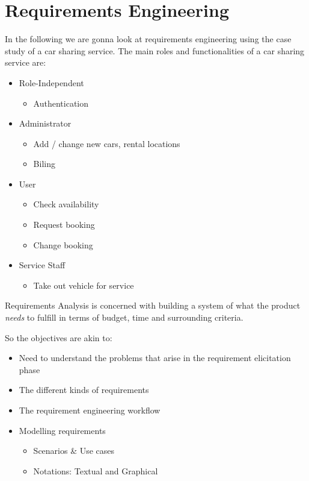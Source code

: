 \documentclass[
../../Software_Engineering_Summary.tex,
]
{subfiles}
\begin{document}
\section{Requirements Engineering}
In the following we are gonna look at requirements engineering using the case study of a car sharing service.
The main roles and functionalities of a car sharing service are:

\begin{greenbox}
    \begin{itemize}
        \item Role-Independent
        \begin{itemize}
            \item Authentication
        \end{itemize}
        \item Administrator
        \begin{itemize}
            \item Add / change new cars, rental locations
            \item Biling
        \end{itemize}
        \item User
        \begin{itemize}
            \item Check availability
            \item Request booking
            \item Change booking
        \end{itemize}
        \item Service Staff
        \begin{itemize}
            \item Take out vehicle for service
        \end{itemize}
    \end{itemize}
\end{greenbox}

Requirements Analysis is concerned with building a system of what the product \textit{needs} to fulfill in terms of budget, time and surrounding criteria.

So the objectives are akin to:

\begin{greenbox}
    \begin{itemize}
        \item Need to understand the problems that arise in the requirement elicitation phase
        \item The different kinds of requirements
        \item The requirement engineering workflow
        \item Modelling requirements
        \begin{itemize}
            \item Scenarios \& Use cases
            \item Notations: Textual and Graphical
        \end{itemize}
    \end{itemize}
\end{greenbox}
\end{document}
